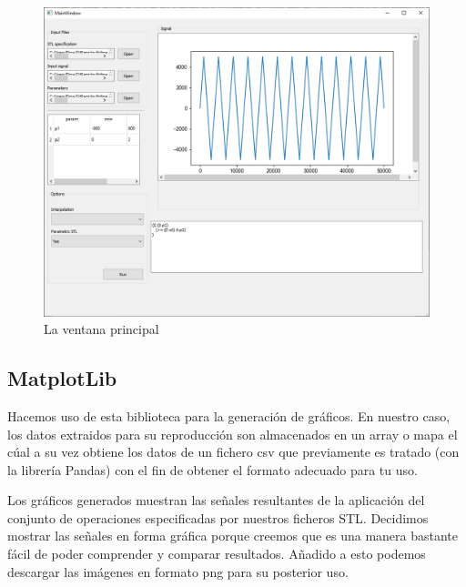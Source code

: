\begin{figure}[htb]
\centering
  \includegraphics[width=1.0\linewidth]{images/gui} 
\caption{La ventana principal}
\label{fig:gui}
\end{figure}

 
 
 
 
\subsection{MatplotLib}
Hacemos uso de esta biblioteca para la generación de gráficos. En nuestro caso, los datos extraidos para su reproducción son almacenados en un array o mapa el cúal a su vez obtiene los datos de un fichero csv que previamente es tratado (con la librería Pandas) con el fin de obtener el formato adecuado para tu uso. 

Los gráficos generados muestran las señales resultantes de la aplicación del conjunto de operaciones especificadas por nuestros ficheros STL.
Decidimos mostrar las señales en forma gráfica porque creemos que es una manera bastante fácil de poder comprender y comparar resultados. Añadido a esto podemos descargar las imágenes en formato png para su posterior uso. 
 
